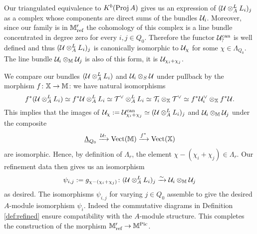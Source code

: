 \documentclass[12pt]{amsart}
\begin{document}
Our triangulated equivalence to $K^b(\operatorname{Proj} A)$ gives us an expression of $(\mathcal{U} \otimes_A^L L_i)_j$ as a complex whose components are direct sums of the bundles $\mathcal{U}_i$.
Moreover, since our family is in $\mathbb{M}_\text{ref}'$ the cohomology of this complex is a line bundle concentrated in degree zero for every $i,j \in Q_0$.
Therefore the functor $\mathcal{U}_?^\text{can}$ is well defined and thus $(\mathcal{U} \otimes_A^L L_i)_j$ is canonically isomorphic to $\mathcal{U}_{\chi}$ for some $\chi \in \Lambda_{Q_0}$.
The line bundle $\mathcal{U}_i \otimes_{\mathbb{M}} \mathcal{U}_j$ is also of this form, it is $\mathcal{U}_{\chi_i+\chi_j}$.

We compare our bundles $(\mathcal{U} \otimes_A^L L_i)$ and $\mathcal{U}_i \otimes_S \mathcal{U}$ under pullback by the morphism $f \colon \mathbb{X} \rightarrow \mathbb{M}$: we have natural isomorphisms
\begin{equation} \label{eq:natisolinebdls}
f^*(\mathcal{U} \otimes_A^L L_i) \simeq f^* \mathcal{U} \otimes_A^L L_i \simeq 
\mathcal{T}^{\vee} \otimes_A^L L_i \simeq \mathcal{T}_i \otimes_{\mathbb{X}} \mathcal{T}^{\vee} \simeq 
f^*\mathcal{U}_{i}^{\vee} \otimes_{\mathbb{X}} f^* \mathcal{U}.
\end{equation}
This implies that the images of $\mathcal{U}_\chi:= \mathcal{U}_{\chi_i + \chi_j}^\text{can} \simeq (\mathcal{U} \otimes_A^L L_i)_j$ and $\mathcal{U}_i \otimes_{\mathbb{M}} \mathcal{U}_j$ under the composite $$\underline{\Lambda}_{Q_0} \xrightarrow{\mathcal{U}_?} \operatorname{Vect}(\mathbb{M}) \xrightarrow{f^*} \operatorname{Vect}(\mathbb{X})$$ are isomorphic.
Hence, by definition of $\Lambda_r$, the element $\chi-(\chi_i+\chi_j) \in \Lambda_r$.
Our refinement data then gives us an isomorphism $$\psi_{i,j}:= g_{\chi-(\chi_i+\chi_j)} \colon (\mathcal{U} \otimes_A^L L_i)_j \xrightarrow{\sim} \mathcal{U}_i \otimes_{\mathbb{M}} \mathcal{U}_j$$ as desired.
The isomorphisms $\psi_{i,j}$ for varying $j \in Q_0$ assemble to give the desired $A$-module isomorphism $\psi_i$. 
Indeed the commutative diagrams in Definition \ref{def:refined} ensure compatibility with the $A$-module structure. 
This completes the construction of the morphism $\mathbb{M}'_{\text{ref}} \rightarrow \mathbb{M}^{\operatorname{Pic}}$.
\end{document}
